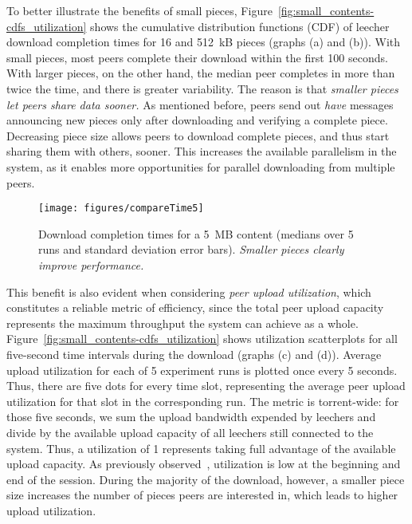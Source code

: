 \documentclass[twocolumn,letterpaper,11pt]{article}
\begin{document}
To better illustrate the benefits of small pieces,
Figure~\ref{fig:small_contents-cdfs_utilization}
shows the cumulative distribution functions (CDF) of leecher download 
completion times for 16 and 512~kB pieces (graphs (a) and (b)).
With small pieces, most peers complete their download within the first 100 seconds.
With larger pieces, on the other hand, the median peer completes in more than twice the 
time, and there is greater variability.
The reason is that \emph{smaller pieces let peers share data sooner.} 
As mentioned before,
peers send out \textit{have} messages announcing new 
pieces only after downloading and verifying a complete piece. Decreasing piece 
size allows peers to download complete pieces, and thus start sharing them with others, sooner.
This increases the available parallelism in the system, as it enables more opportunities
for parallel downloading from multiple peers.

\begin{figure}
\centering
\texttt{[image: figures/compareTime5]}
\caption{Download completion times for a 5~MB content (medians over 5 runs and standard 
deviation error bars). 
\emph{Smaller pieces clearly improve performance.}}
\label{fig:small_contents-completion_comparison}
\end{figure}

This benefit is also evident when considering \textit{peer upload utilization}, 
which constitutes a reliable metric of efficiency, since the total peer upload 
capacity represents the maximum throughput the system can achieve as a whole. 
Figure~\ref{fig:small_contents-cdfs_utilization} shows utilization scatterplots 
for all five-second time intervals during the download (graphs (c) and (d)). 
Average upload utilization for each of 5 experiment runs is plotted once every 5 seconds.
Thus, there are five dots for every time slot, representing the average peer upload utilization 
for that slot in the corresponding run. The metric is torrent-wide: for those five seconds, 
we sum the upload 
bandwidth expended by leechers and divide by the available upload capacity of all 
leechers still connected to the system. 
Thus, a utilization of 1 represents taking full advantage of the available upload capacity.
As previously observed~\cite{legout07}, utilization is low at the beginning and end of the 
session. During the majority
of the download, however, a smaller piece size increases the number of 
pieces peers are interested in, which leads to higher upload utilization.
\end{document}
